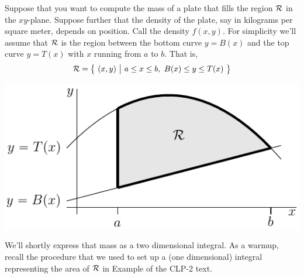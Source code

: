 Suppose that you want to compute the mass of a plate that
fills the region $\mathcal{R}$ in the $xy$-plane. Suppose further that the
density of the plate, say in kilograms per square meter, depends
on position. Call the density $f(x,y)$. For simplicity we'll assume that
$\mathcal{R}$ is the region between the bottom curve $y=B(x)$ and the top
curve $y=T(x)$ with $x$ running from $a$ to $b$. That is,
\begin{align*}
\mathcal{R}=\big\{\ (x,y)\ \big|\ a\le x\le b,\ B(x)\le y\le T(x)\ \big\}
\end{align*}
\begin{efig}
\begin{center}
   \includegraphics{vSliceA.pdf}
\end{center}
\end{efig}
We'll shortly express that mass 
as a two dimensional integral. As a warmup, recall the procedure that
we used  to set up a (one dimensional) integral representing the area 
of $\mathcal{R}$ in Example  of the CLP-2 text.
